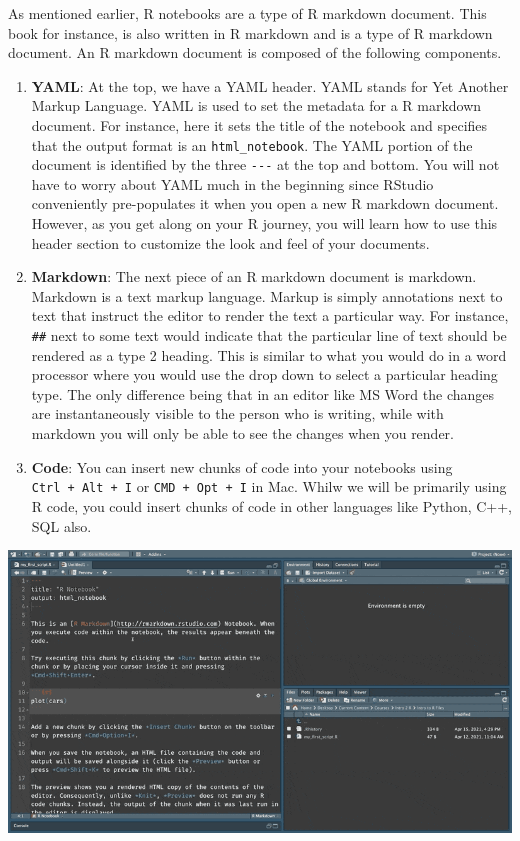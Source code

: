 \documentclass[
]{book}
\providecommand{\tightlist}{%
  \setlength{\itemsep}{0pt}\setlength{\parskip}{0pt}}
\begin{document}
As mentioned earlier, R notebooks are a type of R markdown document. This book for instance, is also written in R markdown and is a type of R markdown document. An R markdown document is composed of the following components.

\begin{enumerate}
\def\labelenumi{\arabic{enumi}.}
\tightlist
\item
  \textbf{YAML}: At the top, we have a YAML header. YAML stands for Yet Another Markup Language. YAML is used to set the metadata for a R markdown document. For instance, here it sets the title of the notebook and specifies that the output format is an \texttt{html\_notebook}. The YAML portion of the document is identified by the three \texttt{-\/-\/-} at the top and bottom. You will not have to worry about YAML much in the beginning since RStudio conveniently pre-populates it when you open a new R markdown document. However, as you get along on your R journey, you will learn how to use this header section to customize the look and feel of your documents.
\item
  \textbf{Markdown}: The next piece of an R markdown document is markdown. Markdown is a text markup language. Markup is simply annotations next to text that instruct the editor to render the text a particular way. For instance, \texttt{\#\#} next to some text would indicate that the particular line of text should be rendered as a type 2 heading. This is similar to what you would do in a word processor where you would use the drop down to select a particular heading type. The only difference being that in an editor like MS Word the changes are instantaneously visible to the person who is writing, while with markdown you will only be able to see the changes when you render.
\item
  \textbf{Code}: You can insert new chunks of code into your notebooks using \texttt{Ctrl\ +\ Alt\ +\ I} or \texttt{CMD\ +\ Opt\ +\ I} in Mac. Whilw we will be primarily using R code, you could insert chunks of code in other languages like Python, C++, SQL also.
\end{enumerate}

\includegraphics{assets/ch_2-notebooks/gifs/notebook_anatomy.gif}
\end{document}
